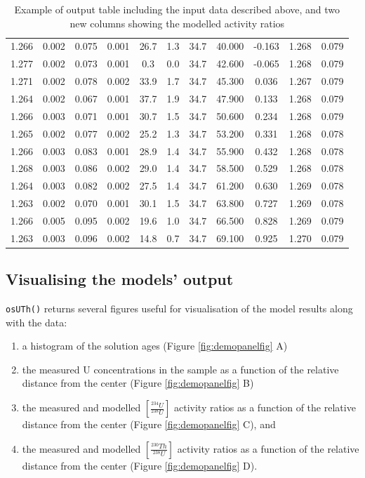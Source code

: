 \documentclass[]{elsarticle} %
\providecommand{\tightlist}{%
  \setlength{\itemsep}{0pt}\setlength{\parskip}{0pt}}
\begin{document}
\begin{table}[ht]
\begin{tabular}{ccccccccccc}
  1.266 & 0.002 & 0.075 & 0.001 & 26.7 & 1.3 & 34.7 & 40.000 & -0.163 & 1.268 & 0.079 \\ 
  1.277 & 0.002 & 0.073 & 0.001 & 0.3 & 0.0 & 34.7 & 42.600 & -0.065 & 1.268 & 0.079 \\ 
  1.271 & 0.002 & 0.078 & 0.002 & 33.9 & 1.7 & 34.7 & 45.300 & 0.036 & 1.267 & 0.079 \\ 
  1.264 & 0.002 & 0.067 & 0.001 & 37.7 & 1.9 & 34.7 & 47.900 & 0.133 & 1.268 & 0.079 \\ 
  1.266 & 0.003 & 0.071 & 0.001 & 30.7 & 1.5 & 34.7 & 50.600 & 0.234 & 1.268 & 0.079 \\ 
  1.265 & 0.002 & 0.077 & 0.002 & 25.2 & 1.3 & 34.7 & 53.200 & 0.331 & 1.268 & 0.078 \\ 
  1.266 & 0.003 & 0.083 & 0.001 & 28.9 & 1.4 & 34.7 & 55.900 & 0.432 & 1.268 & 0.078 \\ 
  1.268 & 0.003 & 0.086 & 0.002 & 29.0 & 1.4 & 34.7 & 58.500 & 0.529 & 1.268 & 0.078 \\ 
  1.264 & 0.003 & 0.082 & 0.002 & 27.5 & 1.4 & 34.7 & 61.200 & 0.630 & 1.269 & 0.078 \\ 
  1.263 & 0.002 & 0.070 & 0.001 & 30.1 & 1.5 & 34.7 & 63.800 & 0.727 & 1.269 & 0.078 \\ 
  1.266 & 0.005 & 0.095 & 0.002 & 19.6 & 1.0 & 34.7 & 66.500 & 0.828 & 1.269 & 0.079 \\ 
  1.263 & 0.003 & 0.096 & 0.002 & 14.8 & 0.7 & 34.7 & 69.100 & 0.925 & 1.270 & 0.079 \\ 
   \hline
\end{tabular}
\caption{\label{tab:outputdata}Example of output table including the input data described above, and two new columns showing the modelled activity ratios} 
\end{table}

\hypertarget{visualising-the-models-output}{%
\subsection{Visualising the models' output}\label{visualising-the-models-output}}

\texttt{osUTh()} returns several figures useful for visualisation of the model results along with the data:

\begin{enumerate}
\def\labelenumi{\arabic{enumi}.}
\tightlist
\item
  a histogram of the solution ages (Figure \ref{fig:demopanelfig} A)
\item
  the measured U concentrations in the sample as a function of the relative distance from the center (Figure \ref{fig:demopanelfig} B)
\item
  the measured and modelled \([\frac{^{234}U}{^{238}U}]\) activity ratios as a function of the relative distance from the center (Figure \ref{fig:demopanelfig} C), and
\item
  the measured and modelled \([\frac{^{230}Th}{^{238}U}]\) activity ratios as a function of the relative distance from the center (Figure \ref{fig:demopanelfig} D).
\end{enumerate}
\end{document}
